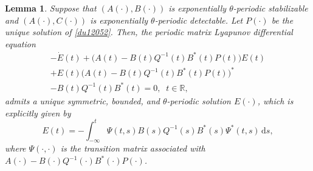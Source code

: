\documentclass[10pt,a4paper]{amsart}
\newtheorem{lemma}{Lemma}
\begin{document}
	\begin{lemma}\label{lya}
		Suppose that $(A(\cdot),B(\cdot))$ is exponentially $\theta$-periodic stabilizable
		and $(A(\cdot), C(\cdot))$ is exponentially $\theta$-periodic detectable. Let $P(\cdot)$ be the unique solution of \eqref{du12052}. Then, the periodic matrix Lyapunov differential equation
		\begin{multline*}
			-\dot{E}(t)+\big(A(t)-B(t)Q^{-1}(t)B^*(t)P(t)\big)E(t)\\
			+E(t)\big(A(t)-B(t)Q^{-1}(t)B^*(t)P(t)\big)^*\\
			-B(t)Q^{-1}(t)B^*(t)=0,\;\;t\in\mathbb R,
		\end{multline*}
		admits a unique symmetric, bounded, and $\theta$-periodic solution $E(\cdot)$, which is explicitly given by
		\begin{equation}\label{lya1}
			E(t)= -\int_{-\infty}^t\Psi(t,s)B(s)Q^{-1}(s)B^*(s)\Psi^*(t,s)\,\mathrm{d}s,
		\end{equation}
		where $\Psi(\cdot,\cdot)$ is the transition matrix associated with $A(\cdot)-B(\cdot)Q^{-1}(\cdot)B^*(\cdot)P(\cdot)$.
	\end{lemma}
\end{document}

